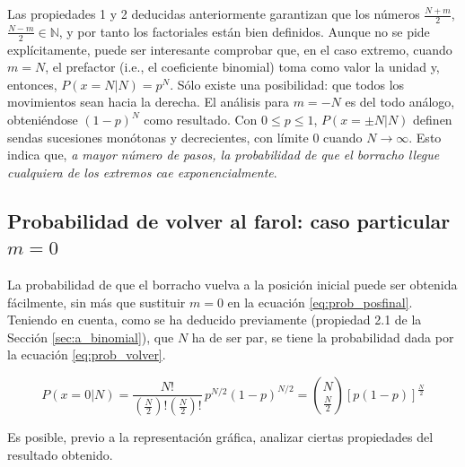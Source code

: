 Las propiedades 1 y 2 deducidas anteriormente garantizan que los números $\frac{N+m}{2}$, $\frac{N-m}{2} \in \mathbb N$, y por tanto los factoriales están bien definidos. Aunque no se pide explícitamente, puede ser interesante comprobar que, en el caso extremo, cuando $m = N$, el prefactor (i.e., el coeficiente binomial) toma como valor la unidad y, entonces, $P\left(x = N | N\right) = p^N$. Sólo existe una posibilidad: que todos los movimientos sean hacia la derecha. El análisis para $m = - N$ es del todo análogo, obteniéndose $(1-p)^N$ como resultado. Con $0 \leq p \leq 1$, $P(x = \pm N | N)$ definen sendas sucesiones monótonas y decrecientes, con límite 0 cuando $N \to \infty$. Esto indica que, \emph{a mayor número de pasos, la probabilidad de que el borracho llegue cualquiera de los extremos cae exponencialmente}.

\subsection{Probabilidad de volver al farol: caso particular $m = 0$}
\label{sec:a_volver}

La probabilidad de que el borracho vuelva a la posición inicial puede ser obtenida fácilmente, sin más que sustituir $m = 0$ en la ecuación \ref{eq:prob_posfinal}. Teniendo en cuenta, como se ha deducido previamente (propiedad 2.1 de la Sección \ref{sec:a_binomial}), que $N$ ha de ser par, se tiene la probabilidad dada por la ecuación \ref{eq:prob_volver}.

\begin{equation}
	\boxed{
	P(x=0 | N) = \frac{N!}{\left(\frac{N}{2} \right)! \left(\frac{N}{2} \right)!} \,p^{N/2} (1-p)^{N/2} = \binom{N}{\frac{N}{2}} \left[p(1-p)\right]^\frac{N}{2}
	}
	\label{eq:prob_volver}
\end{equation}

Es posible, previo a la representación gráfica, analizar ciertas propiedades del resultado obtenido.

